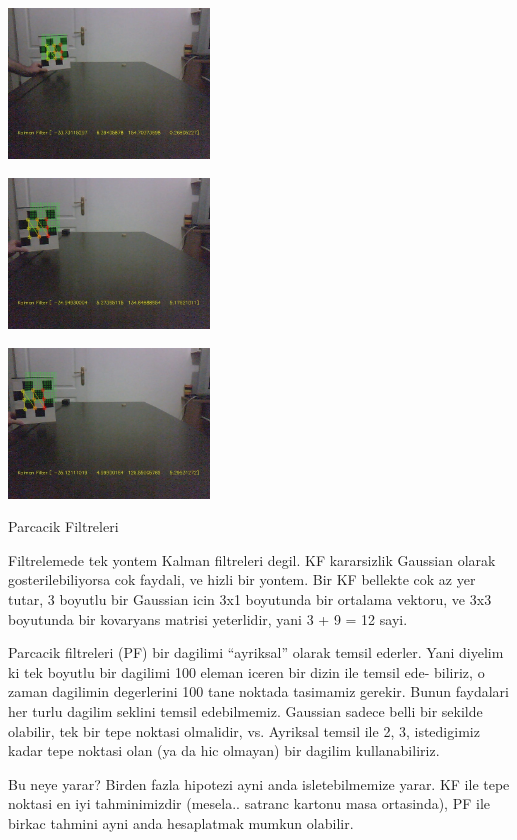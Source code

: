 \documentclass[12pt,fleqn]{article}\usepackage{../common}
\begin{document}
\includegraphics[height=4cm]{cb-kf-2.jpg}

\includegraphics[height=4cm]{cb-kf-3.jpg}

\includegraphics[height=4cm]{cb-kf-4.jpg}

Parcacik Filtreleri

Filtrelemede tek yontem Kalman filtreleri degil. KF kararsizlik Gaussian
olarak gosterilebiliyorsa cok faydali, ve hizli bir yontem. Bir KF bellekte
cok az yer tutar, 3 boyutlu bir Gaussian icin 3x1 boyutunda bir ortalama
vektoru, ve 3x3 boyutunda bir kovaryans matrisi yeterlidir, yani 3 + 9 = 12
sayi.

Parcacik filtreleri (PF) bir dagilimi ``ayriksal'' olarak temsil
ederler. Yani diyelim ki tek boyutlu bir dagilimi 100 eleman iceren bir
dizin ile temsil ede- biliriz, o zaman dagilimin degerlerini 100 tane
noktada tasimamiz gerekir.  Bunun faydalari her turlu dagilim seklini
temsil edebilmemiz. Gaussian sadece belli bir sekilde olabilir, tek bir
tepe noktasi olmalidir, vs. Ayriksal temsil ile 2, 3, istedigimiz kadar
tepe noktasi olan (ya da hic olmayan) bir dagilim kullanabiliriz.

Bu neye yarar? Birden fazla hipotezi ayni anda isletebilmemize yarar. KF
ile tepe noktasi en iyi tahminimizdir (mesela.. satranc kartonu masa
ortasinda), PF ile birkac tahmini ayni anda hesaplatmak mumkun olabilir.
\end{document}
